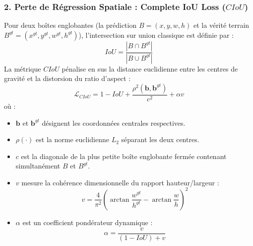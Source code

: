 \documentclass[11pt,a4paper]{article}
\begin{document}
\subsubsection{2. Perte de Régression Spatiale : Complete IoU Loss ($CIoU$)}
Pour deux boîtes englobantes (la prédiction $B = (x, y, w, h)$ et la vérité terrain $B^{gt} = (x^{gt}, y^{gt}, w^{gt}, h^{gt})$), l'intersection sur union classique est définie par :
\begin{equation}
    IoU = \frac{|B \cap B^{gt}|}{|B \cup B^{gt}|}
\end{equation}
La métrique $CIoU$ pénalise en sus la distance euclidienne entre les centres de gravité et la distorsion du ratio d'aspect :
\begin{equation}
    \mathcal{L}_{CIoU} = 1 - IoU + \frac{\rho^2(\mathbf{b}, \mathbf{b}^{gt})}{c^2} + \alpha v
\end{equation}
où :
\begin{itemize}
    \item $\mathbf{b}$ et $\mathbf{b}^{gt}$ désignent les coordonnées centrales respectives.
    \item $\rho(\cdot)$ est la norme euclidienne $L_2$ séparant les deux centres.
    \item $c$ est la diagonale de la plus petite boîte englobante fermée contenant simultanément $B$ et $B^{gt}$.
    \item $v$ mesure la cohérence dimensionnelle du rapport hauteur/largeur :
    \begin{equation}
        v = \frac{4}{\pi^2} \left( \arctan\frac{w^{gt}}{h^{gt}} - \arctan\frac{w}{h} \right)^2
    \end{equation}
    \item $\alpha$ est un coefficient pondérateur dynamique :
    \begin{equation}
        \alpha = \frac{v}{(1 - IoU) + v}
    \end{equation}
\end{itemize}
\end{document}
